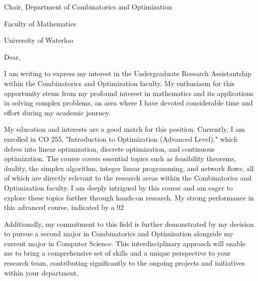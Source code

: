 \documentclass[letterpaper,11pt]{article}
\begin{document}

\qquad Chair, Department of Combinatorics and Optimization 

Faculty of Mathematics 

University of Waterloo
\newline

Dear,
\newline

I am writing to express my interest in the Undergraduate Research Assistantship within the Combinatorics and Optimization faculty. My enthusiasm for this opportunity stems from my profound interest in mathematics and its applications in solving complex problems, an area where I have devoted considerable time and effort during my academic journey.
\newline

My education and interests are a good match for this position. Currently, I am enrolled in CO 255, "Introduction to Optimization (Advanced Level)," which delves into linear optimization, discrete optimization, and continuous optimization. The course covers essential topics such as feasibility theorems, duality, the simplex algorithm, integer linear programming, and network flows, all of which are directly relevant to the research areas within the Combinatorics and Optimization faculty. I am deeply intrigued by this course and am eager to explore these topics further through hands-on research. My strong performance in this advanced course, indicated by a 92%

Additionally, my commitment to this field is further demonstrated by my decision to pursue a second major in Combinatorics and Optimization alongside my current major in Computer Science. This interdisciplinary approach will enable me to bring a comprehensive set of skills and a unique perspective to your research team, contributing significantly to the ongoing projects and initiatives within your department.
\newline
\end{document}
